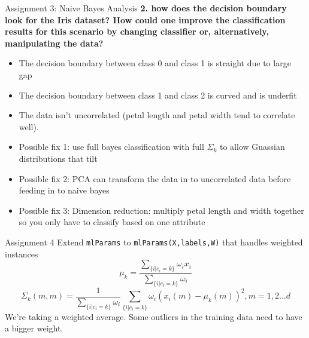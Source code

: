 \documentclass[10pt]{beamer}
\begin{document}
\begin{frame}{Assignment 3: Naive Bayes Analysis}
    \textbf{2. how does the decision boundary look for the Iris dataset? How could one improve
the classification results for this scenario by changing classifier or, alternatively,
manipulating the data?}
    \begin{itemize}
        \item The decision boundary between class 0 and class 1 is straight due to large gap
        \item The decision boundary between class 1 and class 2 is curved and is underfit
        \item The data isn't uncorrelated (petal length and petal width tend to correlate well).
        \item Possible fix 1: use full bayes classification with full $\Sigma_k$ to allow Guassian distributions that tilt 
        \item  Possible fix 2: PCA can transform the data in to uncorrelated data before feeding in to naive bayes
        \item  Possible fix 3: Dimension reduction: multiply petal length and width together so you only have to classify based on one attribute
    \end{itemize}
\end{frame}
\begin{frame}{Assignment 4}
    Extend \texttt{mlParams} to \texttt{mlParams(X,labels,W)} that handles weighted instances
$$\mu_k = \frac{\sum_{\{i|c_i=k\}} \omega_i x_i}{\sum_{\{i|c_i=k\}} \omega_i}$$
$$\Sigma_k(m,m) = \frac{1}{\sum_{\{i|c_i=k\}} \omega_i} \sum_{\{i|c_i=k\}} \omega_i (x_i(m) - \mu_k(m))^2, m = 1,2...d$$
We're taking a weighted average. Some outliers in the training data need to have a bigger weight.
\end{frame}
\end{document}
